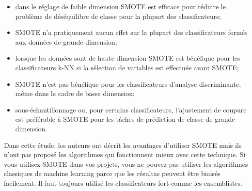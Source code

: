 \documentclass[12pt, french]{report}
\begin{document}
\begin{itemize}
\item dans le réglage de faible dimension SMOTE est efficace pour réduire le problème de déséquilibre de classe pour la plupart des classificateurs;

\item SMOTE n'a pratiquement aucun effet sur la plupart des classificateurs formés aux données de grande dimension;

\item lorsque les données sont de haute dimension SMOTE est bénéfique pour les classificateurs k-NN si la sélection de variables est effectuée avant SMOTE;

\item SMOTE n'est pas bénéfique pour les classificateurs d'analyse discriminante, même dans le cadre de basse dimension;

\item sous-échantillonnage ou, pour certains classificateurs, l'ajustement de coupure est préférable à SMOTE pour les tâches de prédiction de classe de grande dimension.

\end{itemize}

Dans cette étude, les auteurs ont décrit les avantages d'utiliser SMOTE mais ils n'ont pas proposé les algorithmes qui fonctionnent mieux avec cette technique. Si vous utilisez SMOTE dans vos projets, vous ne pouvez pas utiliser les algorithmes classiques de machine learning parce que les résultas peuvent être biaisés facilement. Il faut toujours utilisé les classificateurs fort comme les ensemblistes.


  
\end{document}
